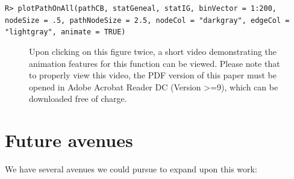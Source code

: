 \documentclass[11pt,a4paper,oldfontcommands,openany]{memoir}
\DeclareRobustCommand{\mybox}[2][gray!15]{%
\begin{tcolorbox}[   %
        breakable,
        left=0pt,
        right=0pt,
        top=0pt,
        bottom=0pt,
        colback=#1,
        colframe=#1,
        width=\dimexpr\textwidth\relax, 
        enlarge left by=0mm,
        boxsep=5pt,
        arc=0pt,outer arc=0pt,
        ]
        #2
\end{tcolorbox}
}
\numberwithin{equation}{section} %
\begin{document}
\mybox{
\texttt{R> plotPathOnAll(pathCB, statGeneal, statIG, binVector = 1:200, nodeSize = .5, pathNodeSize = 2.5, nodeCol = "darkgray", edgeCol = "lightgray", animate = TRUE)}
}

\clearpage

\begin{figure}[H]
    \begin{framed}
    \centering
    \end{framed}
    \caption{Upon clicking on this figure twice, a short video demonstrating the animation features for this function can be viewed. Please note that to properly view this video, the PDF version of this paper must be opened in Adobe Acrobat Reader DC (Version >=9), which can be downloaded free of charge.}
    \label{fig:plotAnimate}
\end{figure}

\section{Future avenues}

We have several avenues we could pursue to expand upon this work:
\end{document}
